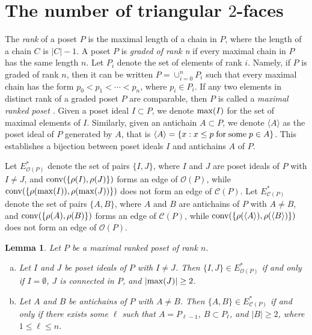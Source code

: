 \documentclass[12pt]{amsart}
\newtheorem{Lemma}[Theorem]{Lemma}
\theoremstyle{definition}
\begin{document}
\section{The number of triangular $2$-faces}

The {\em rank} of a poset $P$ is the maximal length of a chain in $P$, where the length of a chain $C$ is $|C|-1$.
A poset $P$ is {\em graded of rank n} if every maximal chain in $P$ has the same length $n$.
Let $P_i$ denote the set of elements of rank $i$.
Namely, if $P$ is graded of rank $n$, then it can be written $P = \cup_{i=0}^n P_i$ such that every maximal chain has the form $p_0 < p_1 < \cdots < p_n$, where $p_i \in P_i$.
If any two elements in distinct rank of a graded poset $P$ are comparable, then $P$ is called a {\em maximal ranked poset} \cite{AFJ}.
Given a poset ideal $I \subset P$, we denote ${\rm max}(I)$ for the set of maximal elements of $I$. Similarly, given an antichain $A \subset P$, we denote $\langle A \rangle$ as the poset ideal of $P$ generated by $A$, that is $\langle A \rangle = \{x : x \leq p\; {\rm for\;some}\; p \in A\}$. This establishes a bijection between poset ideals $I$ and antichains $A$ of $P$.

Let $E^{*}_{\mathcal{O}(P)}$ denote the set of pairs $\{I, J\}$, where $I$ and $J$ are poset ideals of $P$ with $I \neq J$, and ${\rm conv}(\{\rho(I),\rho(J)\})$ forms an edge of $\mathcal{O}(P)$, while ${\rm conv}(\{\rho({\rm max}(I)),\rho({\rm max}(J))\})$ does not form an edge of $\mathcal{C}(P)$.
Let $E^{*}_{\mathcal{C}(P)}$ denote the set of pairs $\{A, B\}$, where $A$ and $B$ are antichains of $P$ with $A \neq B$, and ${\rm conv}(\{\rho(A),\rho(B)\})$ forms an edge of $\mathcal{C}(P)$, while ${\rm conv}(\{\rho(\langle A \rangle),\rho(\langle B \rangle)\})$ does not form an edge of $\mathcal{O}(P)$.

\begin{Lemma}\label{OCedge}
Let $P$ be a maximal ranked poset of rank $n$.
\begin{enumerate}[(a)]
\item
Let $I$ and $J$ be poset ideals of $P$ with $I \neq J$. 
Then $\{I, J\} \in E^{*}_{\mathcal{O}(P)}$ if and only if $I = \emptyset$, $J$ is connected in $P$, and $|{\rm max}(J)| \geq 2$.  
\item
Let $A$ and $B$ be antichains of $P$ with $A \neq B$.
Then $\{A, B\} \in E^{*}_{\mathcal{C}(P)}$ if and only if there exists 
 some $\ell$ such that $A = P_{\ell -1}$, $B \subset P_{\ell}$, and $|B| \geq 2$, where $1 \leq \ell \leq n$.  
\end{enumerate}
\end{Lemma}
\end{document}
